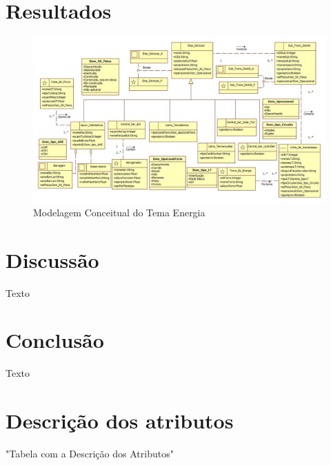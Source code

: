 \documentclass[preprint,authoryear,11pt]{elsarticle}
\begin{document}
\section{Resultados}
\label{sec5}
\begin{multicols}{2}
\end{multicols}

\begin{figure}[H]
\centering
\includegraphics[scale=0.8,angle=90]{fig} 
\caption{Modelagem Conceitual do Tema Energia}
\label{fig:subim1}
\end{figure}

\begin{multicols}{2}

\section{Discussão}
\label{sec6}
Texto

\section{Conclusão}
\label{sec7}
Texto

\appendix
\section{Descrição dos atributos}
\label{appendix}

\end{multicols}

"Tabela com a Descrição dos Atributos"


\end{document}
